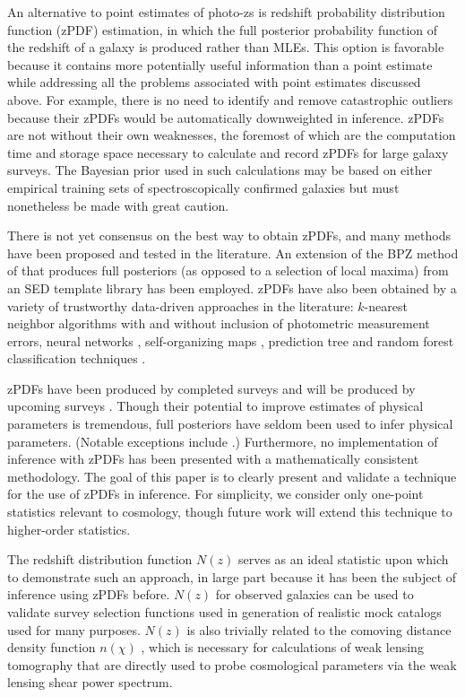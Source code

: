 \documentclass[preprint]{aastex}
\begin{document}
An alternative to point estimates of photo-zs is redshift probability distribution function (zPDF) estimation, in which the full posterior probability function of the redshift of a galaxy is produced rather than MLEs.  \citep{bud08}  This option is favorable because it contains more potentially useful information than a point estimate while addressing all the problems associated with point estimates discussed above.  For example, there is no need to identify and remove catastrophic outliers because their zPDFs would be automatically downweighted in inference.  zPDFs are not without their own weaknesses, the foremost of which are the computation time and storage space necessary to calculate and record zPDFs for large galaxy surveys.  \citep{car14b}  The Bayesian prior used in such calculations may be based on either empirical training sets of spectroscopically confirmed galaxies but must nonetheless be made with great caution.

There is not yet consensus on the best way to obtain zPDFs, and many methods have been proposed and tested in the literature.  An extension of the BPZ method of \citet{ben98} that produces full posteriors (as opposed to a selection of local maxima) from an SED template library has been employed.  \citep{hil11, kel12, lop14}  zPDFs have also been obtained by a variety of trustworthy data-driven approaches in the literature: $k$-nearest neighbor algorithms with \citep{bal08} and without \citep{she11} inclusion of photometric measurement errors, neural networks \citep{bon13}, self-organizing maps \citep{car14a}, prediction tree and random forest classification techniques \citep{car10, car13}.  

zPDFs have been produced by completed surveys \citep{hil11, she11} and will be produced by upcoming surveys \citep{abe09, car14a}.  Though their potential to improve estimates of physical parameters is tremendous, full posteriors have seldom been used to infer physical parameters.  (Notable exceptions include \citet{app12}.)  Furthermore, no implementation of inference with zPDFs has been presented with a mathematically consistent methodology.  The goal of this paper is to clearly present and validate a technique for the use of zPDFs in inference.  For simplicity, we consider only one-point statistics relevant to cosmology, though future work will extend this technique to higher-order statistics.

The redshift distribution function $N(z)$ serves as an ideal statistic upon which to demonstrate such an approach, in large part because it has been the subject of inference using zPDFs before.  \citep{she11, kel12, ben12, bon13, vii15}  $N(z)$ for observed galaxies can be used to validate survey selection functions used in generation of realistic mock catalogs used for many purposes.  \citep{nor01}  $N(z)$ is also trivially related to the comoving distance density function $n(\chi)$ \citep{hog99}, which is necessary for calculations of weak lensing tomography that are directly used to probe cosmological parameters via the weak lensing shear power spectrum.  \citep{mas15}
\end{document}

